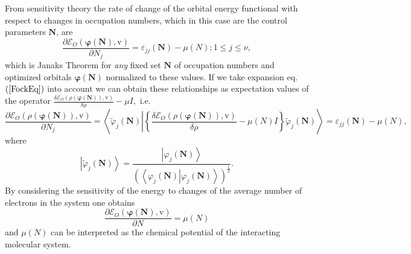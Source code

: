 \documentclass[aps,preprint]{revtex4}%
\begin{document}
From sensitivity theory the rate of change of the orbital energy functional
with respect to changes in occupation numbers, which in this case are the
control parameters $\boldsymbol{N}$, are
\begin{equation}
\frac{\partial\mathcal{E}_{O}\left(  \boldsymbol{\varphi\left(  \boldsymbol{N}%
\right)  },\mathrm{v}\right)  }{\partial N_{j}}=\varepsilon_{jj}\left(
\boldsymbol{N}\right)  -\mu\left(  N\right)  ;1\leq j\leq\nu, \label{Janak}%
\end{equation}
which is Janaks Theorem for \emph{any }fixed set $\boldsymbol{\boldsymbol{N}}$
of occupation numbers and optimized orbitals $\boldsymbol{\varphi\left(
\boldsymbol{N}\right)  }$ normalized to these values. If we take expansion eq.
$\left(  \ref{FockEq}\right)  $ into account we can obtain these relationships
as expectation values of the operator $\frac{\delta\mathcal{E}_{O}\left(
\rho\left(  \boldsymbol{\varphi\left(  \boldsymbol{N}\right)  }\right)
\boldsymbol{,}\mathrm{v}\right)  }{\delta\rho}-\mu I,$ i.e.
\begin{equation}
\frac{\partial\mathcal{E}_{O}\left(  \rho\left(  \boldsymbol{\varphi\left(
\boldsymbol{N}\right)  }\right)  ,\mathrm{v}\right)  }{\partial N_{j}%
}=\left\langle \tilde{\varphi}_{j}\left(  \boldsymbol{N}\right)  \left\vert
\left\{  \frac{\delta\mathcal{E}_{O}\left(  \rho\left(  \boldsymbol{\varphi
\left(  \boldsymbol{N}\right)  }\right)  \boldsymbol{,}\mathrm{v}\right)
}{\delta\rho}-\mu\left(  N\right)  I\right\}  \right.  \tilde{\varphi}%
_{j}\left(  \boldsymbol{N}\right)  \right\rangle =\varepsilon_{jj}\left(
\boldsymbol{N}\right)  -\mu\left(  N\right)  ,
\end{equation}
where
\begin{equation}
\left\vert \tilde{\varphi}_{j}\left(  \boldsymbol{N}\right)  \right\rangle
=\frac{\left\vert \varphi_{j}\left(  \boldsymbol{N}\right)  \right\rangle
}{\left(  \left\langle \left.  \varphi_{j}\left(  \boldsymbol{N}\right)
\right\vert \varphi_{j}\left(  \boldsymbol{N}\right)  \right\rangle \right)
^{\frac{1}{2}}}.
\end{equation}
By considering the sensitivity of the energy to changes of the average number
of electrons in the system one obtains
\begin{equation}
\frac{\partial\mathcal{E}_{O}\left(  \boldsymbol{\varphi}\left(
\boldsymbol{N}\right)  \boldsymbol{,}\mathrm{v}\right)  }{\partial N}%
=\mu\left(  N\right)
\end{equation}
and $\mu\left(  N\right)  $ can be interpreted as the chemical potential of
the interacting molecular system.
\end{document}
